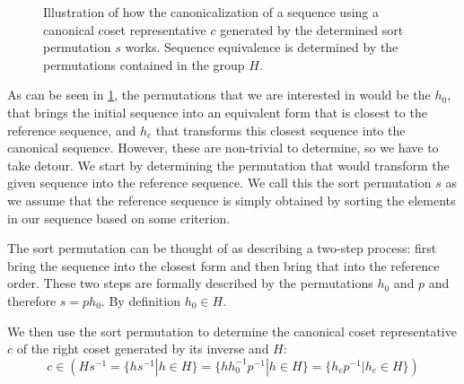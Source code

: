 \documentclass[parskip=half]{scrartcl}
\begin{document}
	\begin{figure}[!htb]

		\caption{Illustration of how the canonicalization of a sequence using a canonical coset representative $c$ generated by the determined sort
		permutation $s$ works. Sequence equivalence is determined by the permutations contained in the group $H$.}
		\label{fig:SequenceCanonicalization}
	\end{figure}

	As can be seen in \cref{fig:SequenceCanonicalization}, the permutations that we are interested in would be the $h_0$, that brings the initial
	sequence into an equivalent form that is closest to the reference sequence, and $h_c$ that transforms this closest sequence into the canonical
	sequence. However, these are non-trivial to determine, so we have to take detour. We start by determining the permutation that would transform the
	given sequence into the reference sequence. We call this the sort permutation $s$ as we assume that the reference sequence is simply obtained by
	sorting the elements in our sequence based on some criterion.

	The sort permutation can be thought of as describing a two-step process: first bring the sequence into the closest form and then bring that into
	the reference order. These two steps are formally described by the permutations $h_0$ and $p$ and therefore $s = p h_0$. By definition
	$h_0 \in H$.

	We then use the sort permutation to determine the canonical coset representative $c$ of the right coset generated by its inverse and $H$:
	\begin{equation}
		c \in \left( H s^{-1} = \{ h s^{-1} | h \in H \} = \{ h h_0^{-1} p^{-1} | h \in H \} = \{ h_c p^{-1} | h_c \in H \} \right)
	\end{equation}
\end{document}
